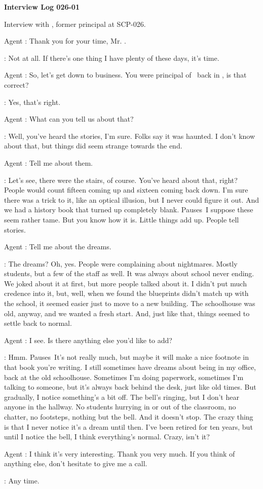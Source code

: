 \textbf{Interview Log 026-01}

Interview with  , former principal at SCP-026.

Agent : Thank you for your time, Mr. .

: Not at all. If there's one thing I have plenty of these days, it's time.

Agent : So, let's get down to business. You were principal of \redacted \ back in \redacted, is that correct?

: Yes, that's right.

Agent : What can you tell us about that?

: Well, you've heard the stories, I'm sure. Folks say it was haunted. I don't know about that, but things did seem strange towards the end.

Agent : Tell me about them.

: Let's see, there were the stairs, of course. You've heard about that, right? People would count fifteen coming up and sixteen coming back down. I'm sure there was a trick to it, like an optical illusion, but I never could figure it out. And we had a history book that turned up completely blank. \lb Pauses\rb \ I suppose these seem rather tame. But you know how it is. Little things add up. People tell stories.

Agent : Tell me about the dreams.

: The dreams? Oh, yes. People were complaining about nightmares. Mostly students, but a few of the staff as well. It was always about school never ending. We joked about it at first, but more people talked about it. I didn't put much credence into it, but, well, when we found the blueprints didn't match up with the school, it seemed easier just to move to a new building. The schoolhouse was old, anyway, and we wanted a fresh start. And, just like that, things seemed to settle back to normal.

Agent : I see. Is there anything else you'd like to add?

: Hmm. \lb Pauses\rb \ It's not really much, but maybe it will make a nice footnote in that book you're writing. I still sometimes have dreams about being in my office, back at the old schoolhouse. Sometimes I'm doing paperwork, sometimes I'm talking to someone, but it's always back behind the desk, just like old times. But gradually, I notice something's a bit off. The bell's ringing, but I don't hear anyone in the hallway. No students hurrying in or out of the classroom, no chatter, no footsteps, nothing but the bell. And it doesn't stop. The crazy thing is that I never notice it's a dream until then. I've been retired for ten years, but until I notice the bell, I think everything's normal. Crazy, isn't it?

Agent : I think it's very interesting. Thank you very much. If you think of anything else, don't hesitate to give me a call.

: Any time.